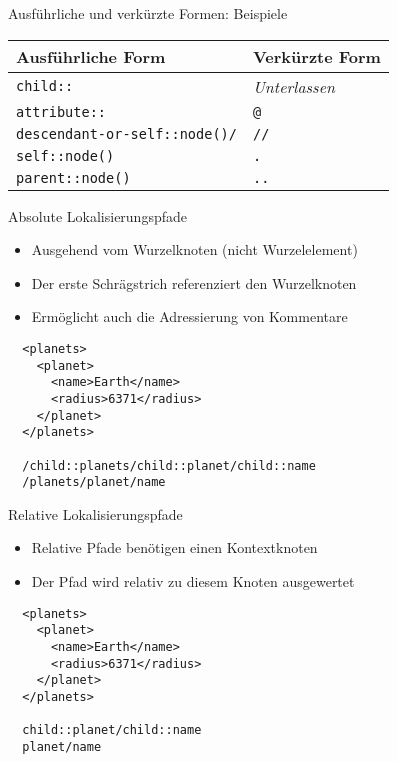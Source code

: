 \documentclass{beamer}
\begin{document}
\begin{frame}[fragile]{Ausführliche und verkürzte Formen: Beispiele}
	
	\centering
	\begin{tabular}{l|l}
		\hline
		Ausführliche Form & Verkürzte Form \\
		\hline
		\texttt{child::} & \emph{Unterlassen} \\
		\texttt{attribute::} & \texttt{@} \\
		\texttt{descendant-or-self::node()/} & \texttt{//} \\
		\texttt{self::node()} & \texttt{.} \\
		\texttt{parent::node()} & \texttt{..}  \\
		\hline
	\end{tabular}
	
\end{frame}

\begin{frame}[fragile]{Absolute Lokalisierungspfade}
	
	\begin{itemize}
		\item Ausgehend vom Wurzelknoten (nicht Wurzelelement)
		\item Der erste Schrägstrich referenziert den Wurzelknoten
		\item Ermöglicht auch die Adressierung von Kommentare
	\end{itemize}
		
	\lstset{language=XML}
	\begin{lstlisting}	
  <planets>
    <planet>
      <name>Earth</name>
      <radius>6371</radius>
    </planet>
  </planets>

  /child::planets/child::planet/child::name
  /planets/planet/name
	\end{lstlisting}
	
\end{frame}

\begin{frame}[fragile]{Relative Lokalisierungspfade}
	
	\begin{itemize}
		\item Relative Pfade benötigen einen Kontextknoten
		\item Der Pfad wird relativ zu diesem Knoten ausgewertet
	\end{itemize}
	
	\lstset{language=XML}
	\begin{lstlisting}	
  <planets>
    <planet>
      <name>Earth</name>
      <radius>6371</radius>
    </planet>
  </planets>

  child::planet/child::name
  planet/name
	\end{lstlisting}
	
\end{frame}
\end{document}

